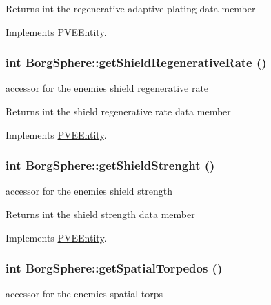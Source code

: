 \begin{DoxyReturn}{Returns}
int the regenerative adaptive plating data member 
\end{DoxyReturn}


Implements \hyperlink{classPVEEntity}{PVEEntity}.

\hypertarget{classBorgSphere_ac8e9c5b8d9cc105baaa8590171758f9c}{
\subsubsection[{getShieldRegenerativeRate}]{\setlength{\rightskip}{0pt plus 5cm}int BorgSphere::getShieldRegenerativeRate ()}}
\label{d6/ddd/classBorgSphere_ac8e9c5b8d9cc105baaa8590171758f9c}
accessor for the enemies shield regenerative rate

\begin{DoxyReturn}{Returns}
int the shield regenerative rate data member 
\end{DoxyReturn}


Implements \hyperlink{classPVEEntity}{PVEEntity}.

\hypertarget{classBorgSphere_ac67f18e6aa38cf24087411603c3b981f}{
\subsubsection[{getShieldStrenght}]{\setlength{\rightskip}{0pt plus 5cm}int BorgSphere::getShieldStrenght ()}}
\label{d6/ddd/classBorgSphere_ac67f18e6aa38cf24087411603c3b981f}
accessor for the enemies shield strength

\begin{DoxyReturn}{Returns}
int the shield strength data member 
\end{DoxyReturn}


Implements \hyperlink{classPVEEntity}{PVEEntity}.

\hypertarget{classBorgSphere_a7cdfa2bc35a23ff6030b2f0071aa0fef}{
\subsubsection[{getSpatialTorpedos}]{\setlength{\rightskip}{0pt plus 5cm}int BorgSphere::getSpatialTorpedos ()}}
\label{d6/ddd/classBorgSphere_a7cdfa2bc35a23ff6030b2f0071aa0fef}
accessor for the enemies spatial torps

